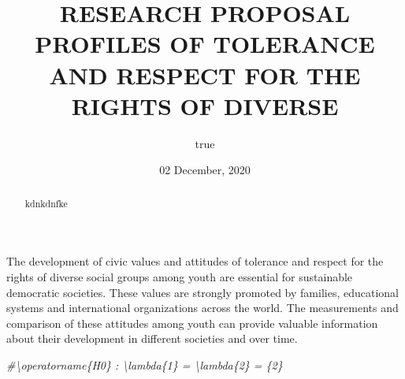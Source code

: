 \documentclass[
  11pt,
]{article}
\title{RESEARCH PROPOSAL PROFILES OF TOLERANCE AND RESPECT FOR THE
RIGHTS OF DIVERSE}
\author{true}
\date{02 December, 2020}
\newenvironment{Shaded}{\begin{snugshade}}{\end{snugshade}}
\newcommand{\CommentTok}[1]{\textcolor[rgb]{0.56,0.35,0.01}{\textit{#1}}}
\begin{document}
\maketitle
\begin{abstract}
kdnkdnfke
\end{abstract}

{
\setcounter{tocdepth}{2}
\tableofcontents
}
The development of civic values and attitudes of tolerance and respect
for the rights of diverse social groups among youth are essential for
sustainable democratic societies. These values are strongly promoted by
families, educational systems and international organizations across the
world. The measurements and comparison of these attitudes among youth
can provide valuable information about their development in different
societies and over time.\\
\newline  

\begin{Shaded}
\begin{Highlighting}[]
\CommentTok{\#\textbackslash{}operatorname\{H0\} : \textbackslash{}lambda\{1\} = \textbackslash{}lambda\{2\} = \{2\}}
\end{Highlighting}
\end{Shaded}
\end{document}
